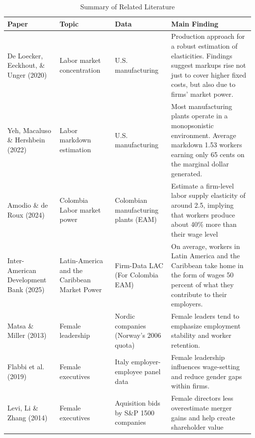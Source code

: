 \documentclass[12pt]{article}
\begin{document}
\begin{table}[H]
\centering
\caption{Summary of Related Literature}
\label{tab:lit_review}
\begin{tabularx}{\textwidth}{>{\raggedright\arraybackslash}p{3cm} 
                              >{\raggedright\arraybackslash}p{2.8cm} 
                              >{\raggedright\arraybackslash}p{2.8cm} 
                              >{\raggedright\arraybackslash}X}

\toprule
\textbf{Paper} & \textbf{Topic} & \textbf{Data} & \textbf{Main Finding} \\
\midrule

De Loecker, Eeckhout, \& Unger (2020) 
& Labor market concentration 
& U.S. manufacturing 
& Production approach for a robust estimation of elasticities. Findings suggest markups rise not just to cover higher fixed costs, but also due to firms' market power. \\

\midrule

Yeh, Macaluso \& Hershbein (2022) 
& Labor markdown estimation 
& U.S. manufacturing 
& Most manufacturing plants operate in a monopsonistic environment. Average markdown 1.53 workers earning only 65 cents on the marginal dollar generated. \\

\midrule

Amodio \& de Roux (2024) 
& Colombia Labor market power 
& Colombian manufacturing plants (EAM)
& Estimate a firm-level labor supply elasticity of around 2.5, implying that workers produce about 40\% more than their wage level \\

\midrule

Inter-American Development Bank (2025) 
& Latin-America and the Caribbean Market Power
& Firm-Data LAC (For Colombia EAM)
& On average, workers in Latin America and the Caribbean take home in the form of wages 50 percent of what they contribute to their employers. \\

\midrule

Matsa \& Miller (2013)
& Female leadership 
& Nordic companies (Norway's 2006 quota) 
& Female leaders tend to emphasize employment stability and worker retention. \\

\midrule

Flabbi et al. (2019)
& Female executives 
& Italy employer-employee panel data 
& Female leadership influences wage-setting and reduce gender gaps within firms. \\

\midrule

Levi, Li \& Zhang (2014) 
& Female executives 
& Aquisition bids by S\&P 1500 companies
& Female directors less overestimate merger gains and help create shareholder value \\

\bottomrule
\end{tabularx}
\end{table}
\end{document}
